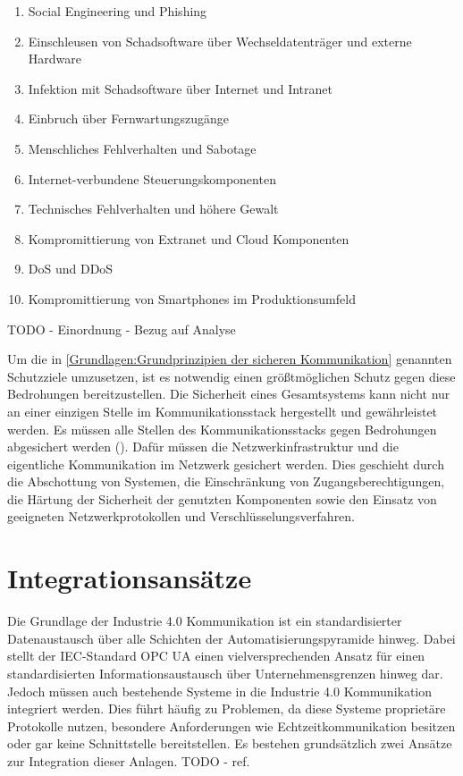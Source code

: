 \begin{enumerate}
    \item Social Engineering und Phishing
    \item Einschleusen von Schadsoftware über Wechseldatenträger und externe Hardware
    \item Infektion mit Schadsoftware über Internet und Intranet
    \item Einbruch über Fernwartungszugänge
    \item Menschliches Fehlverhalten und Sabotage
    \item Internet-verbundene Steuerungskomponenten
    \item Technisches Fehlverhalten und höhere Gewalt
    \item Kompromittierung von Extranet und Cloud Komponenten
    \item \ac{DoS} und \ac{DDoS}
    \item Kompromittierung von Smartphones im Produktionsumfeld
\end{enumerate}

TODO - Einordnung - Bezug auf Analyse

Um die in \autoref{Grundlagen:Grundprinzipien der sicheren Kommunikation} genannten Schutzziele umzusetzen, ist es notwendig einen größtmöglichen Schutz gegen diese Bedrohungen bereitzustellen. Die Sicherheit eines Gesamtsystems kann nicht nur an einer einzigen Stelle im Kommunikationsstack hergestellt und gewährleistet werden. Es müssen alle Stellen des Kommunikationsstacks gegen Bedrohungen abgesichert werden (\cite{sichKom2017}). Dafür müssen die Netzwerkinfrastruktur und die eigentliche Kommunikation im Netzwerk gesichert werden. Dies geschieht durch die Abschottung von Systemen, die Einschränkung von Zugangsberechtigungen, die Härtung der Sicherheit der genutzten Komponenten sowie den Einsatz von geeigneten Netzwerkprotokollen und Verschlüsselungsverfahren.

\section{Integrationsansätze}
Die Grundlage der Industrie 4.0 Kommunikation ist ein standardisierter Datenaustausch über alle Schichten der Automatisierungspyramide hinweg. Dabei stellt der \ac{IEC}-Standard \ac{OPC UA} einen vielversprechenden Ansatz für einen standardisierten Informationsaustausch über Unternehmensgrenzen hinweg dar. Jedoch müssen auch bestehende Systeme in die Industrie 4.0 Kommunikation integriert werden. Dies führt häufig zu Problemen, da diese Systeme proprietäre Protokolle nutzen, besondere Anforderungen wie Echtzeitkommunikation besitzen oder gar keine Schnittstelle bereitstellen. Es bestehen grundsätzlich zwei Ansätze zur Integration dieser Anlagen. TODO - ref.

